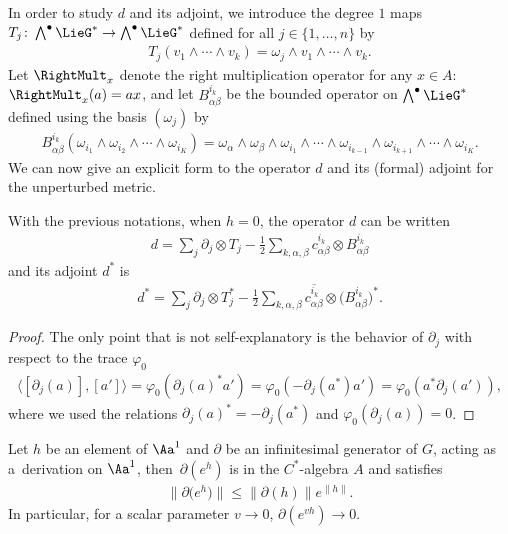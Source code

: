 In order to study $d$ and its adjoint, we introduce the degree $1$ maps $T_j \colon \bigwedge^\bullet \LieG^* \to \bigwedge^\bullet \LieG^*$ def\/ined for all $j \in \{1, \ldots, n\}$ by
\begin{gather*}
T_j( v_1 \wedge \cdots \wedge v_k) = \omega_j \wedge v_1 \wedge \cdots \wedge v_k.
\end{gather*}
Let $\RightMult_{x}$ denote the right multiplication operator for any $x \in A$: $\RightMult_{x}(a) = a x$, and let $B^{i_k}_{\alpha \beta}$ be the bounded operator on $\bigwedge^\bullet \LieG^*$ def\/ined using the basis $(\omega_j)$ by
\begin{gather*}
B^{i_k}_{\alpha \beta}( \omega_{i_1} \wedge \omega_{i_2} \wedge \cdots \wedge \omega_{i_K}) = \omega_\alpha \wedge \omega_\beta \wedge \omega_{i_1} \wedge \cdots \wedge \omega_{i_{k-1}} \wedge \omega_{i_{k+1}} \wedge \cdots \wedge \omega_{i_K}.
\end{gather*}
We can now give an explicit form to the operator $d$ and its (formal) adjoint for the unperturbed metric.
\begin{Lemma}
\label{Lem:Formed}
With the previous notations, when $h = 0$, the operator $d$ can be written
\begin{gather*}
d = \sum_j \partial_j \otimes T_j - \frac{1}{2} \sum_{k,\alpha,\beta} c^{i_k}_{\alpha \beta} \otimes B^{i_k}_{\alpha \beta}
\end{gather*}
and its adjoint $d^*$ is
\begin{gather*}
d^* = \sum_j \partial_j \otimes T_j^* - \frac{1}{2} \sum_{k,\alpha, \beta} \overline{c^{i_k}_{\alpha \beta}} \otimes \big(B^{i_k}_{\alpha \beta}\big)^*.
\end{gather*}
\end{Lemma}

\begin{proof}
The only point that is not self-explanatory is the behavior of $\partial_j$ with respect to the trace $\varphi_0$
\begin{gather*}
\langle [\partial_j(a)], [a'] \rangle = \varphi_0( \partial_j(a)^* a') = \varphi_0( -\partial_j(a^*) a') = \varphi_0(a^* \partial_j(a')),
\end{gather*}
where we used the relations $\partial_j(a)^* = - \partial_j(a^*)$ and $\varphi_0( \partial_j(a)) = 0$.
\end{proof}

\begin{Lemma}
\label{Lem:CVExp}
Let $h$ be an element of $\Aa^1$ and $\partial $ be an infinitesimal generator of $G$, acting as a~derivation on $\Aa^1$, then~$\partial ( e^{h} )$ is in the $C^*$-algebra $A$ and satisfies
\begin{gather*}
\big\| \partial \big( e^{h} \big) \big\| \leqslant \| \partial (h) \| e^{\| h\| }.
\end{gather*}
In particular, for a scalar parameter $v \to 0$, $\partial (e^{v h}) \to 0$.
\end{Lemma}

